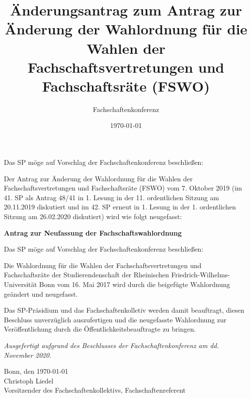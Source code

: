 \documentclass[DIV=12, parskip=half, fontsize=12pt, a4paper]{scrartcl}
\title{Änderungsantrag zum Antrag zur Änderung der Wahlordnung für die Wahlen der Fachschaftsvertretungen und Fachschaftsräte (FSWO)}
\author{Fachschaftenkonferenz}
\date{\today}
\begin{document}
  \maketitle
  Das SP möge auf Vorschlag der Fachschaftenkonferenz beschließen:

  \begin{linenumbers}
    Der Antrag zur Änderung der Wahlordnung für die Wahlen der Fachschaftsvertretungen und Fachschaftsräte (FSWO) vom 7. Oktober 2019 (im 41. SP als Antrag 48/41 in 1. Lesung in der 11. ordentlichen Sitzung am 20.11.2019 diskutiert und im 42. SP erneut in 1. Lesung in der 1. ordentlichen Sitzung am 26.02.2020 diskutiert) wird wie folgt neugefasst:

    \begin{center}
      \bfseries\LARGE Antrag zur Neufassung der Fachschaftswahlordnung
    \end{center}

    Das SP möge auf Vorschlag der Fachschaftenkonferenz beschließen:

    Die Wahlordnung für die Wahlen der Fachschaftsvertretungen und Fachschaftsräte der Studierendenschaft der Rheinischen Friedrich-Wilhelms-Universität Bonn vom 16. Mai 2017 wird durch die beigefügte Wahlordnung geändert und neugefasst.

    Das  SP-Präsidium und das Fachschaftenkolletiv  werden  damit  beauftragt,  diesen Beschluss unverzüglich auszufertigen und die neugefasste Wahlordnung zur Veröffentlichung durch die Öffentlichkeitsbeauftragte zu bringen.
  \end{linenumbers}

  \vspace{1em}
  \textit{Ausgefertigt aufgrund des Beschlusses der Fachschaftenkonferenz am dd. November 2020.}

  Bonn, den \today \\
  Christoph Liedel \\
  {\scriptsize Vorsitzender des Fachschaftenkollektivs, Fachschaftenreferent}

  \clearpage
  
\end{document}
